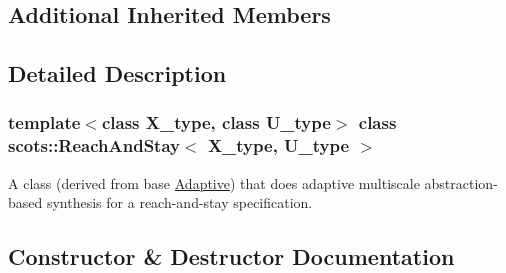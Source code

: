 \subsection*{Additional Inherited Members}


\subsection{Detailed Description}
\subsubsection*{template$<$class X\+\_\+type, class U\+\_\+type$>$\newline
class scots\+::\+Reach\+And\+Stay$<$ X\+\_\+type, U\+\_\+type $>$}

A class (derived from base \hyperlink{classscots_1_1Adaptive}{Adaptive}) that does adaptive multiscale abstraction-\/based synthesis for a reach-\/and-\/stay specification. 

\subsection{Constructor \& Destructor Documentation}
\mbox{\label{classscots_1_1ReachAndStay_ae4bd2a2de95e4cd1287523c49b0b974d}} 

